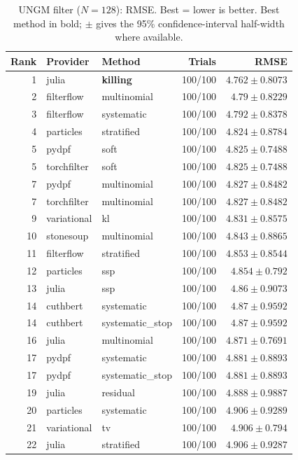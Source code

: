 \begin{table}[!htbp]
\centering
\small
\caption{UNGM filter ($N=128$): RMSE. Best = lower is better. Best method in bold; $\pm$ gives the 95\% confidence-interval half-width where available.}
\label{tab:ungm-filter-rmse}
\begin{tabular}{rllrr}
\toprule
Rank & Provider & Method & Trials & RMSE \\
\midrule
1 & julia & \textbf{killing} & 100/100 & $\mathbf{4.762 \pm 0.8073}$ \\
2 & filterflow & multinomial & 100/100 & $4.79 \pm 0.8229$ \\
3 & filterflow & systematic & 100/100 & $4.792 \pm 0.8378$ \\
4 & particles & stratified & 100/100 & $4.824 \pm 0.8784$ \\
5 & pydpf & soft & 100/100 & $4.825 \pm 0.7488$ \\
5 & torchfilter & soft & 100/100 & $4.825 \pm 0.7488$ \\
7 & pydpf & multinomial & 100/100 & $4.827 \pm 0.8482$ \\
7 & torchfilter & multinomial & 100/100 & $4.827 \pm 0.8482$ \\
9 & variational & kl & 100/100 & $4.831 \pm 0.8575$ \\
10 & stonesoup & multinomial & 100/100 & $4.843 \pm 0.8865$ \\
11 & filterflow & stratified & 100/100 & $4.853 \pm 0.8544$ \\
12 & particles & ssp & 100/100 & $4.854 \pm 0.792$ \\
13 & julia & ssp & 100/100 & $4.86 \pm 0.9073$ \\
14 & cuthbert & systematic & 100/100 & $4.87 \pm 0.9592$ \\
14 & cuthbert & systematic\_stop & 100/100 & $4.87 \pm 0.9592$ \\
16 & julia & multinomial & 100/100 & $4.871 \pm 0.7691$ \\
17 & pydpf & systematic & 100/100 & $4.881 \pm 0.8893$ \\
17 & pydpf & systematic\_stop & 100/100 & $4.881 \pm 0.8893$ \\
19 & julia & residual & 100/100 & $4.888 \pm 0.9887$ \\
20 & particles & systematic & 100/100 & $4.906 \pm 0.9289$ \\
21 & variational & tv & 100/100 & $4.906 \pm 0.794$ \\
22 & julia & stratified & 100/100 & $4.906 \pm 0.9287$ \\

\end{tabular}
\end{table}
